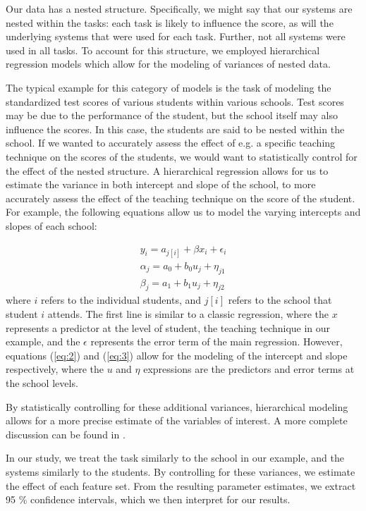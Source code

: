 \documentclass{article}
\begin{document}
Our data has a nested structure. Specifically, we might say that our systems are nested within the tasks: each task is likely to influence the score, as will the underlying systems that were used for each task. Further, not all systems were used in all tasks.
To account for this structure, we employed hierarchical regression models which allow for the modeling of variances of nested data.

The typical example for this category of models is the task of modeling the standardized test scores of various students within various schools. Test scores may be due to the performance of the student, but the school itself may also influence the scores. In this case, the students are said to be nested within the school. If we wanted to accurately assess the effect of e.g. a specific teaching technique on the scores of the students, we would want to statistically control for the effect of the nested structure. A hierarchical regression allows for us to estimate the variance in both intercept and slope of the school, to more accurately assess the effect of the teaching technique on the score of the student. For example, the following equations allow us to model the varying intercepts and slopes of each school:

\begin{align}
y_i = a_{j[i]} + \beta x_i + \epsilon_i \label{eq:1}\\ 
\alpha_j = a_0 + b_0 u_j + \eta_{j1} \label{eq:2}\\
\beta_j = a_1 + b_1 u_j + \eta_{j2} \label{eq:3}
\end{align}
where $i$ refers to the individual students, and $j[i]$ refers to the school that student $i$ attends. The first line is similar to a classic regression, where the $x$ represents a predictor at the level of student, the teaching technique in our example, and the $\epsilon$ represents the error term of the main regression. However, equations (\ref{eq:2}) and (\ref{eq:3}) allow for the modeling of the intercept and slope respectively, where the $u$ and $\eta$ expressions are the predictors and error terms at the school levels. 
 
By statistically controlling for these additional variances, hierarchical modeling allows for a more precise estimate of the variables of interest. A more complete discussion can be found in \cite{gelman2006data}. 

In our study, we treat the task similarly to the school in our example, and the systems similarly to the students. By controlling for these variances, we estimate the effect of each feature set. From the resulting parameter estimates, we extract 95 \% confidence intervals, which we then interpret for our results.
\end{document}
